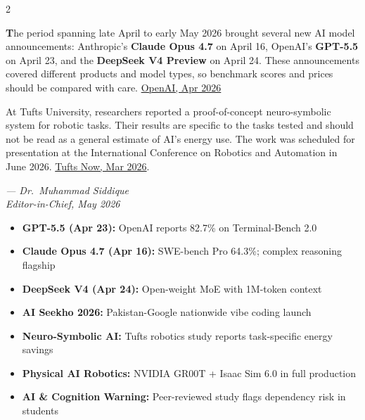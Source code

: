 \documentclass[10pt, a4paper]{article}
\begin{document}
\begin{multicols}{2}

{\small
\lettrine[lines=2, lraise=0.1]{\textcolor{cobalt}{\textbf{T}}}{}he period spanning late April to early May 2026 brought several new AI model announcements: Anthropic’s \textbf{Claude Opus 4.7} on April 16, OpenAI’s \textbf{GPT-5.5} on April 23, and the \textbf{DeepSeek V4 Preview} on April 24. These announcements covered different products and model types, so benchmark scores and prices should be compared with care.
\href{https://openai.com/index/introducing-gpt-5-5/}{OpenAI, Apr 2026}

At Tufts University, researchers reported a proof-of-concept neuro-symbolic system for robotic tasks. Their results are specific to the tasks tested and should not be read as a general estimate of AI’s energy use. The work was scheduled for presentation at the International Conference on Robotics and Automation in June 2026.
\href{https://now.tufts.edu/2026/03/17/new-ai-models-could-slash-energy-use-while-dramatically-improving-performance}{Tufts Now, Mar 2026}.

}
\begin{flushright}
{\small\itshape\color{cobalt} --- Dr.\ Muhammad Siddique}\\
{\footnotesize\color{midgray}\itshape Editor-in-Chief, May 2026}
\end{flushright}

\columnbreak

\begin{sidestrip}[title={\color{black}\faNewspaper\quad What Changed in AI This Fortnight}]
  \begin{itemize}[label={\color{electric}}]
    \item {\color{white}\textbf{GPT-5.5 (Apr 23):}}
      {\small\color{white!80} OpenAI reports 82.7\% on Terminal-Bench 2.0}
    \item {\color{white}\textbf{Claude Opus 4.7 (Apr 16):}}
      {\small\color{white!80} SWE-bench Pro 64.3\%; complex reasoning flagship}
    \item {\color{white}\textbf{DeepSeek V4 (Apr 24):}}
      {\small\color{white!80} Open-weight MoE with 1M-token context}
    \item {\color{white}\textbf{AI Seekho 2026:}}
      {\small\color{white!80} Pakistan-Google nationwide vibe coding launch}
    \item {\color{white}\textbf{Neuro-Symbolic AI:}}
      {\small\color{white!80} Tufts robotics study reports task-specific energy savings}
    \item {\color{white}\textbf{Physical AI Robotics:}}
      {\small\color{white!80} NVIDIA GR00T + Isaac Sim 6.0 in full production}
    \item {\color{white}\textbf{AI \& Cognition Warning:}}
      {\small\color{white!80} Peer-reviewed study flags dependency risk in students}
  \end{itemize}
\end{sidestrip}


\end{multicols}
\end{document}

